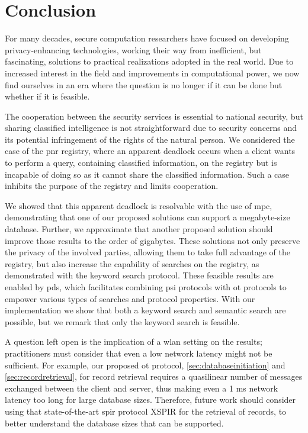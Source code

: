 \chapter{Conclusion}
\label{chap:conclusion}

For many decades, secure computation researchers have focused on developing privacy-enhancing technologies, working their way from inefficient, but fascinating, solutions to practical realizations adopted in the real world. Due to increased interest in the field and improvements in computational power, we now find ourselves in an era where the question is no longer if it can be done but whether if it is feasible. 

The cooperation between the security services is essential to national security, but sharing classified intelligence is not straightforward due to security concerns and its potential infringement of the rights of the natural person. We considered the case of the \acrshort{pnr} registry, where an apparent deadlock occurs when a client wants to perform a query, containing classified information, on the registry but is incapable of doing so as it cannot share the classified information. Such a case inhibits the purpose of the registry and limits cooperation.

We showed that this apparent deadlock is resolvable with the use of \acrshort{mpc}, demonstrating that one of our proposed solutions can support a megabyte-size database. Further, we approximate that another proposed solution should improve those results to the order of gigabytes. These solutions not only preserve the privacy of the involved parties, allowing them to take full advantage of the registry, but also increase the capability of searches on the registry, as demonstrated with the keyword search protocol. These feasible results are enabled by \acrshort{pds}, which facilitates combining \acrshort{psi} protocols with \acrshort{ot} protocols to empower various types of searches and protocol properties. With our implementation we show that both a keyword search and semantic search are possible, but we remark that only the keyword search is feasible.

A question left open is the implication of a \acrshort{wlan} setting on the results; practitioners must consider that even a low network latency might not be sufficient. For example, our proposed \acrshort{ot} protocol, \cref{sec:databaseinitiation} and \cref{sec:recordretrieval}, for record retrieval requires a quasilinear number of messages exchanged between the client and server, thus making even a 1 ms network latency too long for large database sizes. Therefore, future work should consider using that state-of-the-art \acrshort{spir} protocol XSPIR \cite{ESORICS:LinLiuMal22} for the retrieval of records, to better understand the database sizes that can be supported.

